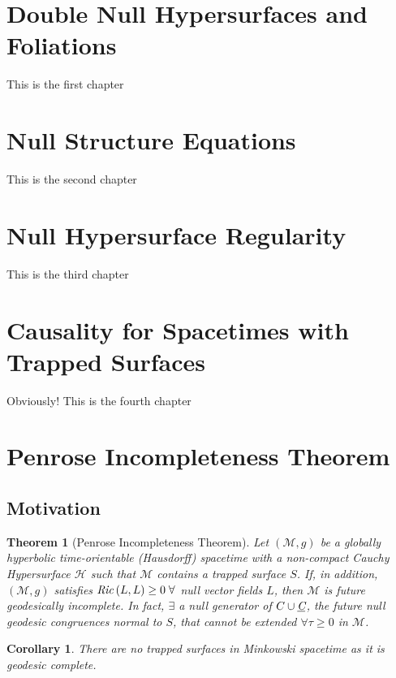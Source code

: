 \documentclass[12pt, a4paper]{report}
\theoremstyle{bfnote}
\newtheorem{theorem}{Theorem}[section]
\newtheorem{corollary}{Corollary}[theorem]
\begin{document}
\section{Double Null Hypersurfaces and Foliations}
This is the first chapter

\section{Null Structure Equations}
This is the second chapter

\section{Null Hypersurface Regularity}
This is the third chapter

\section{Causality for Spacetimes with Trapped Surfaces}
Obviously! This is the fourth chapter


\section{Penrose Incompleteness Theorem}
\subsection{Motivation}
\begin{theorem}[Penrose Incompleteness Theorem]\label{incompletethm}
Let $\left(\mathcal{M}, g\right)$ be a globally hyperbolic
time-orientable (Hausdorff) spacetime with a non-compact Cauchy Hypersurface
$\mathcal{H}$ such that $\mathcal{M}$ contains a trapped surface $S$. If, in
addition, $\left(\mathcal{M}, g\right)$ satisfies $\text{\textit{Ric}}\left(L,
L\right) \geq 0 \;\forall$ null vector fields $L$, then $\mathcal{M}$ is future
geodesically incomplete. In fact, $\exists$ a null generator of $C \cup
\textit{\underbar{C}}$, the future null geodesic congruences normal to $S$, that cannot
be extended $\forall \tau \geq 0$ in $\mathcal{M}$.
\end{theorem}

\begin{corollary}{\label{MinkGeodcomplete}} 
    There are no trapped surfaces in Minkowski spacetime as it is geodesic complete.
\end{corollary}
\end{document}
